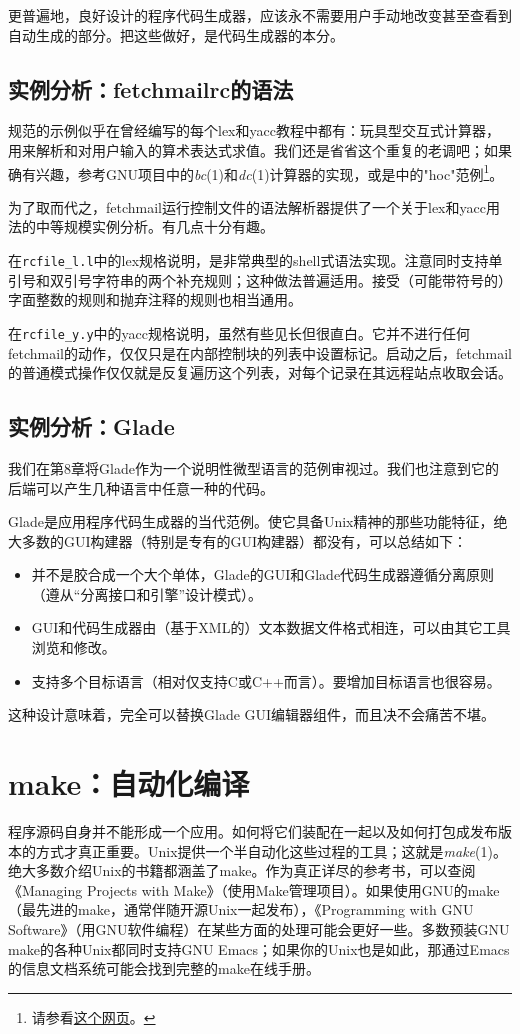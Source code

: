 \documentclass[12pt,oneside]{book}
\begin{document}
更普遍地，良好设计的程序代码生成器，应该永不需要用户手动地改变甚至查看到自动生成的部分。把这些做好，是代码生成器的本分。

\subsection{实例分析：fetchmailrc的语法}
规范的示例似乎在曾经编写的每个lex和yacc教程中都有：玩具型交互式计算器，用来解析和对用户输入的算术表达式求值。我们还是省省这个重复的老调吧；如果确有兴趣，参考GNU项目中的\textit{bc}(1)和\textit{dc}(1)计算器的实现，或是\cite{Kernighan-Pike84}中的"hoc"范例\footnote{请参看\href{http://cm.bell-labs.com/cm/cs/upe/}{这个网页}。}。

为了取而代之，fetchmail运行控制文件的语法解析器提供了一个关于lex和yacc用法的中等规模实例分析。有几点十分有趣。

在\verb+rcfile_l.l+中的lex规格说明，是非常典型的shell式语法实现。注意同时支持单引号和双引号字符串的两个补充规则；这种做法普遍适用。接受（可能带符号的）字面整数的规则和抛弃注释的规则也相当通用。

在\verb+rcfile_y.y+中的yacc规格说明，虽然有些见长但很直白。它并不进行任何fetchmail的动作，仅仅只是在内部控制块的列表中设置标记。启动之后，fetchmail的普通模式操作仅仅就是反复遍历这个列表，对每个记录在其远程站点收取会话。

\subsection{实例分析：Glade}
我们在第8章将Glade作为一个说明性微型语言的范例审视过。我们也注意到它的后端可以产生几种语言中任意一种的代码。

Glade是应用程序代码生成器的当代范例。使它具备Unix精神的那些功能特征，绝大多数的GUI构建器（特别是专有的GUI构建器）都没有，可以总结如下：
\begin{itemize}
\item 并不是胶合成一个大个单体，Glade的GUI和Glade代码生成器遵循分离原则（遵从“分离接口和引擎”设计模式）。
\item GUI和代码生成器由（基于XML的）文本数据文件格式相连，可以由其它工具浏览和修改。
\item 支持多个目标语言（相对仅支持C或C++而言）。要增加目标语言也很容易。
\end{itemize}

这种设计意味着，完全可以替换Glade GUI编辑器组件，而且决不会痛苦不堪。

\section{make：自动化编译}
程序源码自身并不能形成一个应用。如何将它们装配在一起以及如何打包成发布版本的方式才真正重要。Unix提供一个半自动化这些过程的工具；这就是\textit{make}(1)。绝大多数介绍Unix的书籍都涵盖了make。作为真正详尽的参考书，可以查阅《Managing Projects with Make》（使用Make管理项目）\cite{Oram-Talbot}。如果使用GNU的make（最先进的make，通常伴随开源Unix一起发布），《Programming with GNU Software》（用GNU软件编程）\cite{Loukides-Oram}在某些方面的处理可能会更好一些。多数预装GNU make的各种Unix都同时支持GNU Emacs；如果你的Unix也是如此，那通过Emacs的信息文档系统可能会找到完整的make在线手册。
\end{document}
